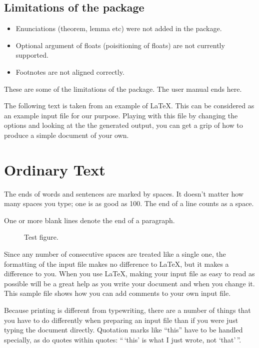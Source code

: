 \documentclass[twocolumn]{article}
\begin{document}
\subsection{Limitations of the package}
\begin{itemize}
\item Enunciations (theorem, lemma etc) were not added in the package.
\item Optional argument of floats (poisitioning of floats) are not
  currently supported.
\item Footnotes are not aligned correctly.
\end{itemize}

These are some of the limitations of the package. The user manual ends here.

The following text is taken from an example of \LaTeX.  This can be
considered as an example input file for our purpose. Playing with this
file by changing the options and looking at the the generated output,
you can get a grip of how to produce a simple document of your own.

\section{Ordinary Text}

The ends of words and sentences are marked by spaces. It doesn't
matter how many spaces you type; one is as good as 100. The end of a
line counts as a space.

One or more blank lines denote the end  of a paragraph. 
\begin{figure}
\vbox{\centering{}}
\caption{Test figure.}
\end{figure}

Since any number of consecutive spaces are treated like a single one,
the formatting of the input file makes no difference to \LaTeX, but it
makes a difference to you. When you use \LaTeX, making your input file
as easy to read as possible will be a great help as you write your
document and when you change it. This sample file shows how you can
add comments to your own input file.

Because printing is different from typewriting, there are a number of
things that you have to do differently when preparing an input file
than if you were just typing the document directly. Quotation marks
like ``this'' have to be handled specially, as do quotes within
quotes: ``\,`this' is what I just wrote, not `that'\,''.
\end{document}
